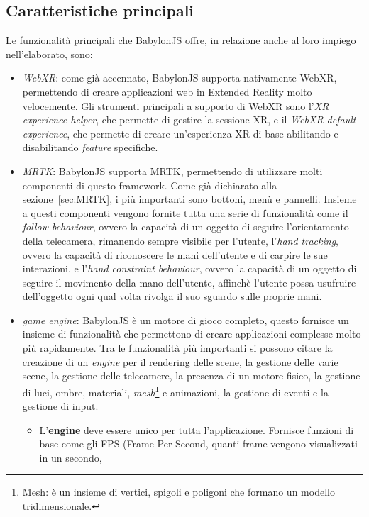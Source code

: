 \subsection{Caratteristiche principali}\label{subsec:BabylonJS_caratteristiche}
Le funzionalità principali che BabylonJS offre, in relazione anche al loro impiego nell'elaborato, sono:
\begin{itemize}
    \item \textit{WebXR}: come già accennato, BabylonJS supporta nativamente WebXR, permettendo di creare applicazioni web in Extended Reality molto velocemente. Gli strumenti principali
    a supporto di WebXR sono l'\textit{XR experience helper}, che permette di gestire la sessione XR, e il \textit{WebXR default experience}, che permette di creare un'esperienza
    XR di base abilitando e disabilitando \textit{feature} specifiche.
    \item \textit{MRTK}: BabylonJS supporta MRTK, permettendo di utilizzare molti componenti di questo framework. Come già dichiarato alla sezione~\ref{sec:MRTK}, i più importanti 
    sono bottoni, menù e pannelli. Insieme a questi componenti vengono fornite tutta una serie di funzionalità come il \textit{follow behaviour}, ovvero la capacità di un oggetto di 
    seguire l'orientamento della telecamera, rimanendo sempre visibile per l'utente, l'\textit{hand tracking}, ovvero la capacità di riconoscere le mani dell'utente e di 
    carpire le sue interazioni, e l'\textit{hand constraint behaviour}, ovvero la capacità di un oggetto di seguire il movimento della mano dell'utente, affinchè l'utente possa
    usufruire dell'oggetto ogni qual volta rivolga il suo sguardo sulle proprie mani.
    \item \textit{game engine}: BabylonJS è un motore di gioco completo, questo fornisce un insieme di funzionalità che permettono di creare applicazioni complesse molto più rapidamente.
    Tra le funzionalità più importanti si possono citare la creazione di un \textit{engine} per il rendering delle scene, la gestione delle varie scene, la gestione delle telecamere,
    la presenza di un motore fisico, la gestione di luci, ombre, materiali, \textit{mesh}\footnote{Mesh: è un insieme di vertici, spigoli e poligoni che formano un modello tridimensionale.}
    e animazioni, la gestione di eventi e la gestione di input.
    \begin{itemize}
        \item L'\textbf{engine} deve essere unico per tutta l'applicazione. Fornisce funzioni di base come gli FPS (Frame Per Second, quanti frame vengono visualizzati in un secondo,

\end{itemize}
\end{itemize}
